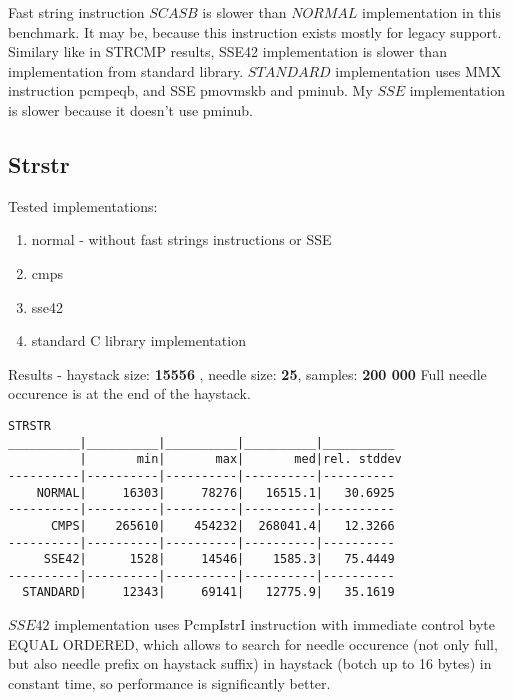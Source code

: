 \documentclass[11pt,a4paper]{article}
\begin{document}
Fast string instruction $SCASB$ is slower than $NORMAL$ implementation in this benchmark.
It may be, because this instruction exists mostly for legacy support.
Similary like in STRCMP results, SSE42 implementation is slower than implementation from standard library.
$STANDARD$ implementation uses MMX instruction pcmpeqb, and SSE pmovmskb and pminub.
My $SSE$ implementation is slower because it doesn't use pminub.


\subsection{Strstr}\label{subsec:strstr}
    Tested implementations:
    \begin{enumerate}
        \item normal - without fast strings instructions or SSE
        \item cmps
        \item sse42
        \item standard C library implementation
    \end{enumerate}
Results - haystack size: \textbf{15556} , needle size: \textbf{25}, samples: \textbf{200 000} \newline
Full needle occurence is at the end of the haystack.
\begin{lstlisting}[]
STRSTR
__________|__________|__________|__________|__________
          |       min|       max|       med|rel. stddev
----------|----------|----------|----------|----------
    NORMAL|     16303|     78276|   16515.1|   30.6925
----------|----------|----------|----------|----------
      CMPS|    265610|    454232|  268041.4|   12.3266
----------|----------|----------|----------|----------
     SSE42|      1528|     14546|    1585.3|   75.4449
----------|----------|----------|----------|----------
  STANDARD|     12343|     69141|   12775.9|   35.1619
\end{lstlisting}
$SSE42$ implementation uses PcmpIstrI instruction with immediate control byte EQUAL ORDERED, which allows to search for needle occurence (not only full, but also needle prefix on haystack suffix) in haystack (botch up to 16 bytes) in constant time, so performance is significantly better.
\end{document}
